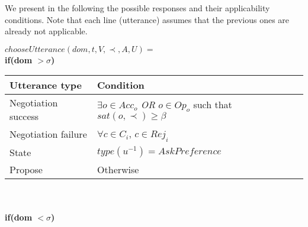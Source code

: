 \documentclass{article}
\begin{document}
		We present in the following the possible responses and their applicability conditions. Note that each line (utterance)  assumes that the previous ones are already not applicable.
	
	$ chooseUtterance(dom, t, V, \prec, A, U) = $ \\
	
	
	\textbf{if(\textbf{dom  $>\sigma$})} \\
	\begin{tabular}{|p{3cm}|p{9cm}|}
		\hline
		\textbf{Utterance type} & Condition \\
		\hline
	 Negotiation success & $\exists o \in Acc_o$   \emph{OR} $o \in Op_o$ such that  $sat(o, \prec) \geq \beta$ \\
		\hline
		Negotiation failure & $ \forall c \in C_i$,  $c \in Rej_i$\\
		\hline
		State & $type(u^{-1}) = AskPreference$ \\
		\hline
		Propose & Otherwise  \\
		
	\hline
	\end{tabular}
	\\ \\
		
	\textbf{if(\textbf{dom  $<\sigma$})} \\
	
\end{document}
